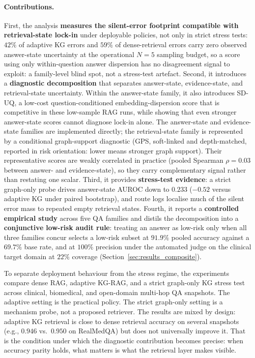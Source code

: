 \paragraph{Contributions.}
First, the analysis \textbf{measures the silent-error footprint compatible with
retrieval-state lock-in} under deployable policies, not only in strict stress
tests: $42\%$ of adaptive KG errors and $59\%$ of dense-retrieval errors
carry zero observed answer-state uncertainty at the operational $N{=}5$ sampling
budget, so a score using only within-question answer dispersion has no
disagreement signal to exploit: a family-level blind spot, not a stress-test
artefact.
Second, it introduces a \textbf{diagnostic decomposition} that separates
answer-state, evidence-state, and retrieval-state uncertainty.
Within the answer-state family, it also introduces SD-UQ, a low-cost
question-conditioned embedding-dispersion score that is competitive in these
low-sample RAG runs, while showing that even stronger answer-state scores cannot
diagnose lock-in alone.
The answer-state and evidence-state families are implemented directly; the
retrieval-state family is represented by a conditional graph-support
diagnostic (GPS, soft-linked and depth-matched, reported in risk orientation:
lower means stronger graph support).
Their representative scores are weakly correlated in practice (pooled Spearman
$\rho=0.03$ between answer- and evidence-state), so they carry complementary
signal rather than restating one scalar.
Third, it provides \textbf{stress-test evidence}: a strict graph-only probe
drives answer-state AUROC down to $0.233$ ($-0.52$ versus adaptive KG under
paired bootstrap), and route logs localise much of the silent error mass to
repeated empty retrieval states.
Fourth, it reports a \textbf{controlled empirical study} across five QA
families and distils the decomposition into a \textbf{conjunctive low-risk
audit rule}: treating an answer as low-risk only when all three families concur
selects a low-risk subset at $91.9\%$ pooled accuracy against a $69.7\%$ base
rate, and at $100\%$ precision under the automated judge on the clinical target
domain at $22\%$ coverage (Section~\ref{sec:results_composite}).

To separate deployment behaviour from the stress regime, the experiments compare
dense RAG, adaptive KG-RAG, and a strict graph-only KG stress test across clinical,
biomedical, and open-domain multi-hop QA snapshots.
The adaptive setting is the practical policy. The strict graph-only setting is
a mechanism probe, not a proposed retriever.
The results are mixed by design: adaptive KG retrieval is close to dense
retrieval accuracy on several snapshots (e.g., $0.946$ vs.\ $0.950$ on
RealMedQA) but does not universally improve it.
That is the condition under which the diagnostic contribution becomes precise:
when accuracy parity holds, what matters is what the retrieval layer makes
visible.


